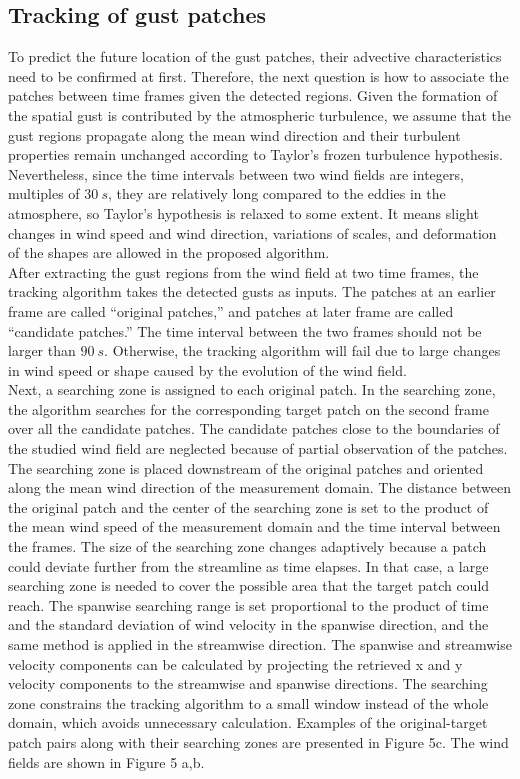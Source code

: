 \subsection{Tracking of gust patches}
To predict the future location of the gust patches, their advective characteristics need to be confirmed at first. Therefore, the next question is how to associate the patches between time frames given the detected regions. Given the formation of the spatial gust is contributed by the atmospheric turbulence, we assume that the gust regions propagate along the mean wind direction and their turbulent properties remain unchanged according to Taylor’s frozen turbulence hypothesis. Nevertheless, since the time intervals between two wind fields are integers, multiples of $30~s$, they are relatively long compared to the eddies in the atmosphere, so Taylor’s hypothesis is relaxed to some extent. It means slight changes in wind speed and wind direction, variations of scales, and deformation of the shapes are allowed in the proposed algorithm.\\
After extracting the gust regions from the wind field at two time frames, the tracking algorithm takes the detected gusts as inputs. The patches at an earlier frame are called “original patches,” and patches at later frame are called “candidate patches.” The time interval between the two frames should not be larger than $90~s$. Otherwise, the tracking algorithm will fail due to large changes in wind speed or shape caused by the evolution of the wind field.\\
Next, a searching zone is assigned to each original patch. In the searching zone, the algorithm searches for the corresponding target patch on the second frame over all the candidate patches. The candidate patches close to the boundaries of the studied wind field are neglected because of partial observation of the patches. The searching zone is placed downstream of the original patches and oriented along the mean wind direction of the measurement domain. The distance between the original patch and the center of the searching zone is set to the product of the mean wind speed of the measurement domain and the time interval between the frames. The size of the searching zone changes adaptively because a patch could deviate further from the streamline as time elapses. In that case, a large searching zone is needed to cover the possible area that the target patch could reach. The spanwise searching range is set proportional to the product of time and the standard deviation of wind velocity in the spanwise direction, and the same method is applied in the streamwise direction. The spanwise and streamwise velocity components can be calculated by projecting the retrieved x and y velocity components to the streamwise and spanwise directions. The searching zone constrains the tracking algorithm to a small window instead of the whole domain, which avoids unnecessary calculation. Examples of the original-target patch pairs along with their searching zones are presented in Figure 5c. The wind fields are shown in Figure 5 a,b.


